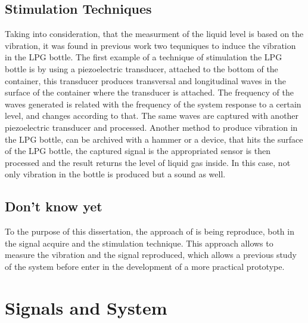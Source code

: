 \subsection{Stimulation Techniques}
Taking into consideration, that the measurment of the liquid level is based on the vibration, it was found in previous work two tequniques to induce the vibration in the LPG bottle.
The first example of a technique of stimulation the LPG bottle is by using a piezoelectric transducer, attached to the bottom of the container, this transducer produces transversal and longitudinal waves in the surface of the container where the transducer is attached. The frequency of the waves generated is related with the frequency of the system response to a certain level, and changes according to that. The same waves are captured with another piezoelectric transducer and processed\cite{jahnLevelSensorFluids2014a}.
Another method to produce vibration in the LPG bottle, can be archived with a hammer or a device, that hits the surface of the LPG bottle, the captured signal is the appropriated sensor is then processed and the result returns the level of liquid gas inside. In this case, not only vibration in the bottle is produced but a sound as well\cite{wuAnalysisImplementationNoncontact2016a}.
\subsection{Don't know yet} %
To the purpose of this dissertation, the approach of \citeauthor{wuAnalysisImplementationNoncontact2016a} is being reproduce, both in the signal acquire and the stimulation technique. This approach allows to measure the vibration and the signal reproduced, which allows a previous study of the system before enter in the development of a more practical prototype.


\section{Signals and System}


